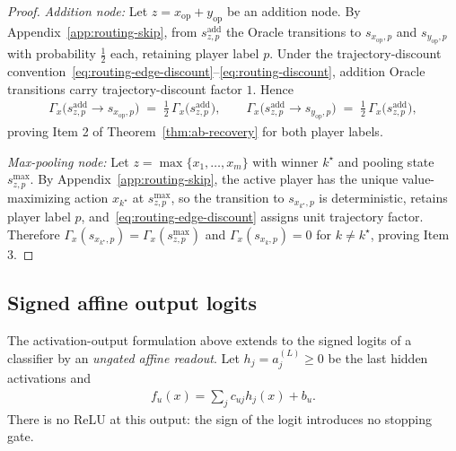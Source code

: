 \documentclass[twoside]{article}
\newcommand{\1}{\mathbf{1}}
\begin{document}
\begin{proof}
\emph{Addition node:} Let $z = x_{\mathrm{op}} + y_{\mathrm{op}}$ be an addition node. By
Appendix~\ref{app:routing-skip}, from $s^{\mathrm{add}}_{z,p}$ the Oracle transitions to
$s_{x_{\mathrm{op}},p}$ and $s_{y_{\mathrm{op}},p}$ with probability $\tfrac12$ each, retaining
player label $p$. Under the trajectory-discount
convention~\eqref{eq:routing-edge-discount}--\eqref{eq:routing-discount}, addition Oracle
transitions carry trajectory-discount factor $1$. Hence
\begin{align}
    \Gamma_x\!\bigl(s^{\mathrm{add}}_{z,p}\to s_{x_{\mathrm{op}},p}\bigr) \;=\;
    \tfrac12\,\Gamma_x\!\bigl(s^{\mathrm{add}}_{z,p}\bigr),
    \qquad
    \Gamma_x\!\bigl(s^{\mathrm{add}}_{z,p}\to s_{y_{\mathrm{op}},p}\bigr) \;=\;
    \tfrac12\,\Gamma_x\!\bigl(s^{\mathrm{add}}_{z,p}\bigr),
\end{align}
proving Item 2 of Theorem~\ref{thm:ab-recovery} for both player labels.

\emph{Max-pooling node:} Let $z = \max\{x_1,\dots,x_m\}$ with winner $k^\star$ and pooling state
$s_{z,p}^{\max}$. By Appendix~\ref{app:routing-skip}, the active player has the unique
value-maximizing action $x_{k^\star}$ at $s_{z,p}^{\max}$, so the transition to $s_{x_{k^\star},p}$
is deterministic, retains player label $p$, and~\eqref{eq:routing-edge-discount} assigns unit
trajectory factor. Therefore $\Gamma_x(s_{x_{k^\star},p}) = \Gamma_x(s_{z,p}^{\max})$ and
$\Gamma_x(s_{x_k,p}) = 0$ for $k \neq k^\star$, proving Item 3.
\end{proof}

\subsection{Signed affine output logits}\label{app:affine-readout}

The activation-output formulation above extends to the signed logits of a classifier by an
\emph{ungated affine readout}. Let $h_j=a_j^{(L)}\geq0$ be the last hidden activations and
\begin{align}\label{eq:affine-readout}
    f_u(x)=\sum_j c_{uj}h_j(x)+b_u.
\end{align}
There is no ReLU at this output: the sign of the logit introduces no stopping gate.
\end{document}
